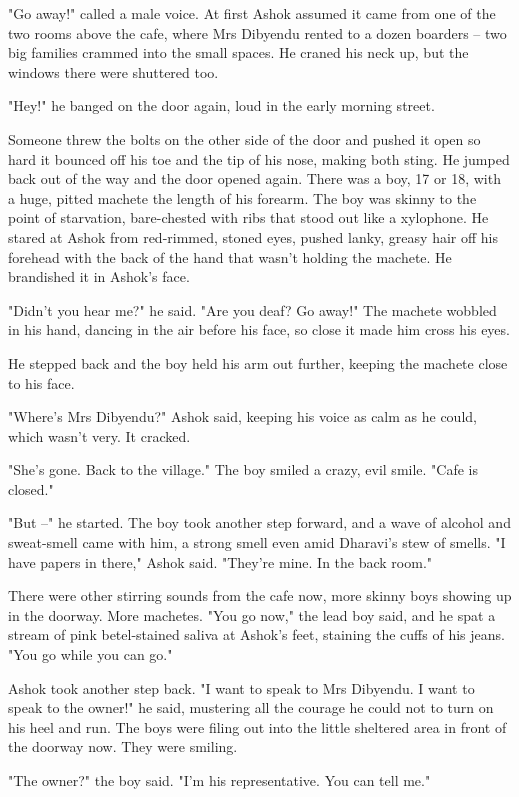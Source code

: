 "Go away!" called a male voice. At first Ashok assumed it came from
one of the two rooms above the cafe, where Mrs Dibyendu rented to a
dozen boarders -- two big families crammed into the small spaces.
He craned his neck up, but the windows there were shuttered too.

"Hey!" he banged on the door again, loud in the early morning
street.

Someone threw the bolts on the other side of the door and pushed it
open so hard it bounced off his toe and the tip of his nose, making
both sting. He jumped back out of the way and the door opened
again. There was a boy, 17 or 18, with a huge, pitted machete the
length of his forearm. The boy was skinny to the point of
starvation, bare-chested with ribs that stood out like a xylophone.
He stared at Ashok from red-rimmed, stoned eyes, pushed lanky,
greasy hair off his forehead with the back of the hand that wasn't
holding the machete. He brandished it in Ashok's face.

"Didn't you hear me?" he said. "Are you deaf? Go away!" The machete
wobbled in his hand, dancing in the air before his face, so close
it made him cross his eyes.

He stepped back and the boy held his arm out further, keeping the
machete close to his face.

"Where's Mrs Dibyendu?" Ashok said, keeping his voice as calm as he
could, which wasn't very. It cracked.

"She's gone. Back to the village." The boy smiled a crazy, evil
smile. "Cafe is closed."

"But --" he started. The boy took another step forward, and a wave
of alcohol and sweat-smell came with him, a strong smell even amid
Dharavi's stew of smells. "I have papers in there," Ashok said.
"They're mine. In the back room."

There were other stirring sounds from the cafe now, more skinny
boys showing up in the doorway. More machetes. "You go now," the
lead boy said, and he spat a stream of pink betel-stained saliva at
Ashok's feet, staining the cuffs of his jeans. "You go while you
can go."

Ashok took another step back. "I want to speak to Mrs Dibyendu. I
want to speak to the owner!" he said, mustering all the courage he
could not to turn on his heel and run. The boys were filing out
into the little sheltered area in front of the doorway now. They
were smiling.

"The owner?" the boy said. "I'm his representative. You can tell
me."

